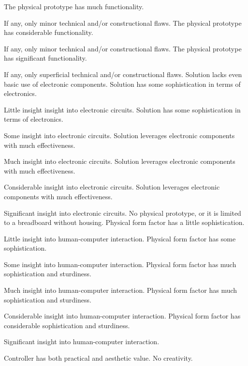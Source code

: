 \documentclass{../../fal_assignment}
\begin{document}
\begin{markingrubric}
	\grade The physical prototype has much functionality.
	\par If any, only minor technical and/or constructional flaws.
	\grade The physical prototype has considerable functionality.
	\par If any, only minor technical and/or constructional flaws.
	\grade The physical prototype has significant functionality.
	\par If any, only superficial technical and/or constructional flaws.
	\grade\fail Solution lacks even basic use of electronic components.
	\grade Solution has some sophistication in terms of electronics.
	\par Little insight insight into electronic circuits.
	\grade Solution has some sophistication  in terms of electronics.
	\par Some insight into electronic circuits.
	\grade Solution leverages electronic components with much effectiveness.
	\par Much insight into electronic circuits.
	\grade Solution leverages electronic components with much effectiveness.
	\par Considerable insight into electronic circuits.
	\grade Solution leverages electronic components with much effectiveness.
	\par Significant insight into electronic circuits.
	\grade\fail No physical prototype, or it is limited to a breadboard without housing.
	\grade Physical form factor has a little sophistication.
	\par Little insight into human-computer interaction.
	\grade Physical form factor has some sophistication.
	\par Some insight into human-computer interaction.
	\grade Physical form factor has much sophistication and sturdiness.
	\par Much insight into human-computer interaction.
	\grade Physical form factor has much sophistication  and sturdiness.
	\par Considerable insight into human-computer interaction.
	\grade Physical form factor has considerable sophistication and sturdiness.
	\par Significant insight into human-computer interaction.
	\par Controller has both practical and aesthetic value.
	\grade\fail No creativity.

\end{markingrubric}
\end{document}
